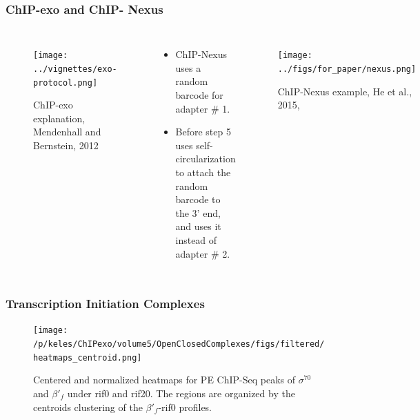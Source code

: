 \documentclass[compress,table,xcolor=dvipsnames]{beamer}\usepackage[]{graphicx}\usepackage[]{color}
\newcommand{\sig}{\sigma^{70}}
\begin{document}
\begin{frame}[plain,label=nexus]
\frametitle{ChIP-exo and ChIP- Nexus}

\begin{columns}
  \begin{figure}[H]
    \texttt{[image: ../vignettes/exo-protocol.png]}
\caption{ChIP-exo explanation, Mendenhall and Bernstein, 2012 \cite{exo_gb}}
  \end{figure}


\begin{itemize}
\item ChIP-Nexus uses a random barcode for adapter $\#$ 1.
\item Before step 5 uses self-circularization to attach the random
  barcode to the 3' end, and uses it instead of adapter $\#$ 2.

\end{itemize}
  \begin{figure}[H]
    \centering
    \texttt{[image: ../figs/for\_paper/nexus.png]}
    \caption{ChIP-Nexus example, He et al., 2015, \cite{chipnexus}
      \hyperlink{future}{}}
  \end{figure}


\end{columns}

\end{frame}


\begin{frame}[label=tic]
\frametitle{Transcription Initiation Complexes}

  \begin{figure}[H]
  \centering
 \texttt{[image: /p/keles/ChIPexo/volume5/OpenClosedComplexes/figs/filtered/heatmaps\_centroid.png]}
 \caption{Centered and normalized heatmaps for PE ChIP-Seq peaks of
   $\sig$ and $\beta'_f$ under rif0 and rif20. The regions are
   organized by the centroids clustering of the $\beta'_f$-rif0
   profiles. \hyperlink{future}{}}
  \label{fig:hm1}
\end{figure}




\end{frame}
\end{document}
